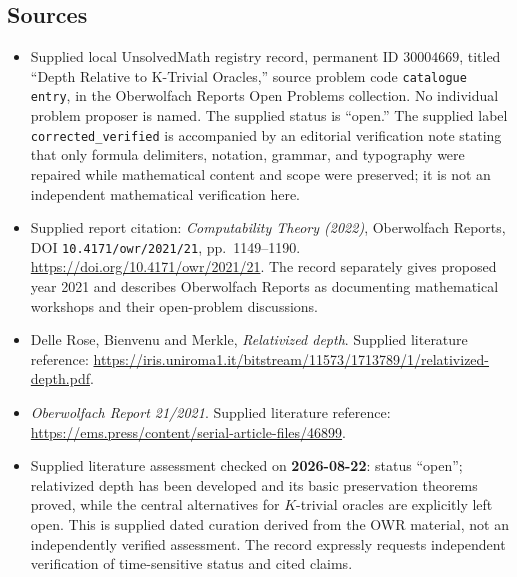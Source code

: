\documentclass[11pt]{article}
\begin{document}
\subsection{Sources}
\begin{itemize}
\item Supplied local UnsolvedMath registry record, permanent ID \(30004669\), titled ``Depth Relative to K-Trivial Oracles,'' source problem code \texttt{catalogue entry}, in the Oberwolfach Reports Open Problems collection. No individual problem proposer is named. The supplied status is ``open.'' The supplied label \texttt{corrected\_verified} is accompanied by an editorial verification note stating that only formula delimiters, notation, grammar, and typography were repaired while mathematical content and scope were preserved; it is not an independent mathematical verification here.
\item Supplied report citation: \emph{Computability Theory (2022)}, Oberwolfach Reports, DOI \texttt{10.4171/owr/2021/21}, pp.~1149--1190. \url{https://doi.org/10.4171/owr/2021/21}. The record separately gives proposed year 2021 and describes Oberwolfach Reports as documenting mathematical workshops and their open-problem discussions.
\item Delle Rose, Bienvenu and Merkle, \emph{Relativized depth}. Supplied literature reference: \url{https://iris.uniroma1.it/bitstream/11573/1713789/1/relativized-depth.pdf}.
\item \emph{Oberwolfach Report 21/2021}. Supplied literature reference: \url{https://ems.press/content/serial-article-files/46899}.
\item Supplied literature assessment checked on \textbf{2026-08-22}: status ``open''; relativized depth has been developed and its basic preservation theorems proved, while the central alternatives for \(K\)-trivial oracles are explicitly left open. This is supplied dated curation derived from the OWR material, not an independently verified assessment. The record expressly requests independent verification of time-sensitive status and cited claims.
\end{itemize}
\end{document}
